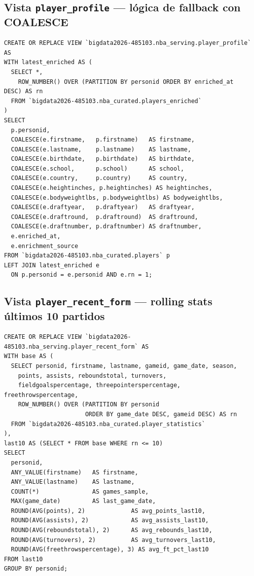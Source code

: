 \documentclass[12pt, letterpaper]{article}
\begin{document}
\subsection{Vista \texttt{player\_profile} — lógica de fallback con COALESCE}

\begin{lstlisting}[style=codestyle, caption={Vista \texttt{player\_profile} --- enriquecimiento por COALESCE sobre el join con \texttt{players\_enriched}}]
CREATE OR REPLACE VIEW `bigdata2026-485103.nba_serving.player_profile` AS
WITH latest_enriched AS (
  SELECT *,
    ROW_NUMBER() OVER (PARTITION BY personid ORDER BY enriched_at DESC) AS rn
  FROM `bigdata2026-485103.nba_curated.players_enriched`
)
SELECT
  p.personid,
  COALESCE(e.firstname,   p.firstname)   AS firstname,
  COALESCE(e.lastname,    p.lastname)    AS lastname,
  COALESCE(e.birthdate,   p.birthdate)   AS birthdate,
  COALESCE(e.school,      p.school)      AS school,
  COALESCE(e.country,     p.country)     AS country,
  COALESCE(e.heightinches, p.heightinches) AS heightinches,
  COALESCE(e.bodyweightlbs, p.bodyweightlbs) AS bodyweightlbs,
  COALESCE(e.draftyear,   p.draftyear)   AS draftyear,
  COALESCE(e.draftround,  p.draftround)  AS draftround,
  COALESCE(e.draftnumber, p.draftnumber) AS draftnumber,
  e.enriched_at,
  e.enrichment_source
FROM `bigdata2026-485103.nba_curated.players` p
LEFT JOIN latest_enriched e
  ON p.personid = e.personid AND e.rn = 1;
\end{lstlisting}

\subsection{Vista \texttt{player\_recent\_form} — rolling stats últimos 10 partidos}

\begin{lstlisting}[style=codestyle, caption={Vista \texttt{player\_recent\_form} --- promedios rolling sobre los 10 partidos más recientes}]
CREATE OR REPLACE VIEW `bigdata2026-485103.nba_serving.player_recent_form` AS
WITH base AS (
  SELECT personid, firstname, lastname, gameid, game_date, season,
    points, assists, reboundstotal, turnovers,
    fieldgoalspercentage, threepointerspercentage, freethrowspercentage,
    ROW_NUMBER() OVER (PARTITION BY personid
                       ORDER BY game_date DESC, gameid DESC) AS rn
  FROM `bigdata2026-485103.nba_curated.player_statistics`
),
last10 AS (SELECT * FROM base WHERE rn <= 10)
SELECT
  personid,
  ANY_VALUE(firstname)   AS firstname,
  ANY_VALUE(lastname)    AS lastname,
  COUNT(*)               AS games_sample,
  MAX(game_date)         AS last_game_date,
  ROUND(AVG(points), 2)             AS avg_points_last10,
  ROUND(AVG(assists), 2)            AS avg_assists_last10,
  ROUND(AVG(reboundstotal), 2)      AS avg_rebounds_last10,
  ROUND(AVG(turnovers), 2)          AS avg_turnovers_last10,
  ROUND(AVG(freethrowspercentage), 3) AS avg_ft_pct_last10
FROM last10
GROUP BY personid;
\end{lstlisting}
\end{document}
